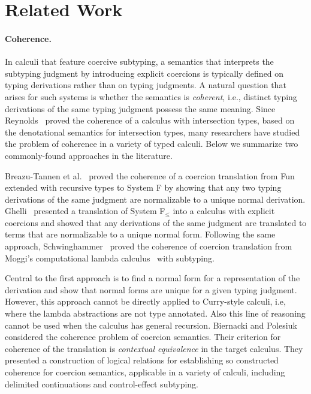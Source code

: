 
\section{Related Work}

\paragraph{Coherence.}
In calculi that feature coercive subtyping, a semantics that interprets the
subtyping judgment by introducing explicit coercions is typically defined on
typing derivations rather than on typing judgments. A natural
question that arises
for such systems is whether the semantics is \textit{coherent}, i.e.,
distinct typing derivations of the same typing judgment possess the same
meaning. Since Reynolds~\citep{Reynolds_1991} proved the coherence of a calculus with
intersection types, based on the denotational semantics for intersection types,
many researchers have studied the problem of coherence in a variety of typed
calculi. Below we summarize two commonly-found approaches in the literature.

Breazu-Tannen et al.~\citep{Breazu_Tannen_1991} proved
the coherence of a coercion translation from Fun~\citep{cardelli1985understanding}
extended with recursive types to System F by showing that any two
typing derivations of the same judgment are normalizable to a unique
normal derivation. %
Ghelli~\citep{Curien_1992} presented a translation of System F$_\leq$ into a calculus
with explicit coercions and showed that any derivations of the same judgment are
translated to terms that are normalizable to a unique normal form. Following the
same approach, Schwinghammer~\citep{SCHWINGHAMMER_2008} proved the coherence of coercion
translation from Moggi's computational lambda calculus~\citep{Moggi_1991} with subtyping.



Central to the first approach is to find a normal form for a representation of
the derivation and show that normal forms are unique for a given typing
judgment. However, this approach cannot be directly applied to Curry-style
calculi, i.e, where the lambda abstractions are not type annotated. Also this
line of reasoning cannot be used when the calculus has general recursion.
Biernacki and Polesiuk~\citep{biernacki2015logical} considered the coherence
problem of coercion semantics. Their criterion for coherence of the translation is
\textit{contextual equivalence} in the target calculus. They presented a construction of
logical relations for establishing so constructed coherence for coercion semantics,
applicable in a variety of calculi, including delimited continuations and
control-effect subtyping.

